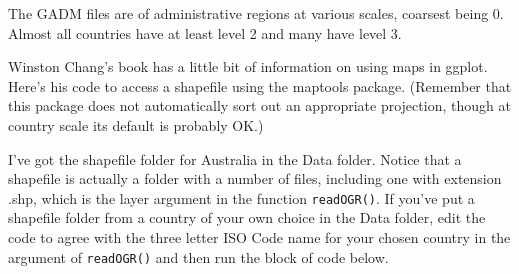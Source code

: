 \documentclass[titlepage]{book}\usepackage{knitr}
\begin{document}
The GADM files are of administrative regions at various scales, coarsest being 0. Almost all countries have at least level 2 and many have level 3.

Winston Chang's book has a little bit of information on using maps in ggplot. Here's his code to access a shapefile using the maptools package. (Remember that this package does not automatically sort out an appropriate projection, though at country scale its default is probably OK.) 






I've got the shapefile folder for Australia in the Data folder. Notice that a shapefile is actually a folder with a number of files, including one with extension .shp, which is the layer argument in the function \texttt{readOGR()}. If you've put a shapefile folder from a country of your own choice in the Data folder, edit the code to agree with the three letter ISO Code name for your chosen country in the argument of \texttt{readOGR()} and then run the block of code below.

\begin{knitrout}
\color{fgcolor}\begin{kframe}
\begin{alltt}
 \hlkwb{<-} \hlstd{(} \hlstd{=} \hlstd{,}  \hlstd{=}\hlstd{)}  
                                                     
\hlstd{)}                                                 
 \hlkwb{<-}                                           
                                                   
 \hlkwb{<-}  \hlstd{(}   \hlopt{+} \hlstd{()}
 \hlkwb{<-}  \hlopt{+} \hlstd{(}\hlstd{)}
\end{alltt}
\end{kframe}
\end{knitrout}
\end{document}
